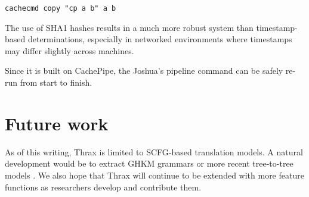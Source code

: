 \documentclass[11pt]{article}
\begin{document}
\verb|cachecmd copy "cp a b" a b|

\noindent The use of SHA1 hashes results in a much more robust system than
timestamp-based determinations, especially in networked environments
where timestamps may differ slightly across machines.

Since it is built on CachePipe, the Joshua's pipeline command can be
safely re-run from start to finish.

\section{Future work}

As of this writing, Thrax is limited to SCFG-based translation models.
A natural development would be to extract GHKM grammars
\cite{galley2004what} or more recent tree-to-tree models
\cite{zhang2008,liu2009,chiang2010}.  We also hope that Thrax will
continue to be extended with more feature functions as researchers
develop and contribute them.




\end{document}
